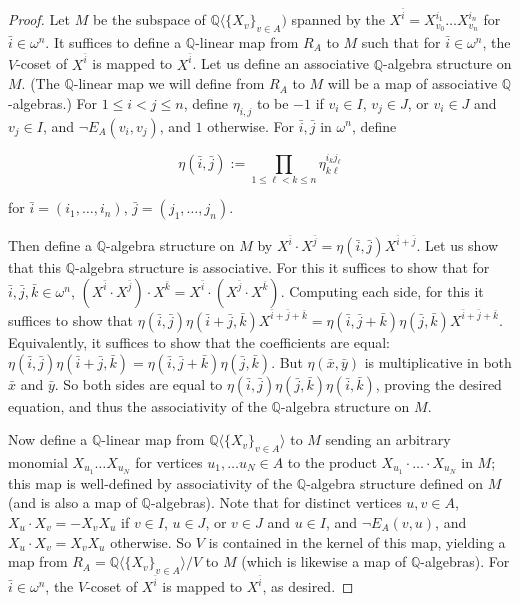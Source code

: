 \documentclass{amsart}
\theoremstyle{definition}
\theoremstyle{remark}
\numberwithin{equation}{section}
\begin{document}
\begin{proof}
    Let $M$ be the subspace of $\mathbb{Q}\langle\{ X_{v} \}_{v \in A})$ spanned by the $X^{\bar{i}} = X_{v_{0}}^{i_{1}} \ldots X_{v_{n}}^{i_{n}}$ for $\bar{i} \in \omega^{n}$. It suffices to define a $\mathbb{Q}$-linear map from $R_{A}$ to $M$ such that for $\bar{i} \in \omega^{n}$, the $V$-coset of $X^{\bar{i}}$ is mapped to $X^{\bar{i}}$. Let us define an associative $\mathbb{Q}$-algebra structure on $M$. (The $\mathbb{Q}$-linear map we will define from $R_{A}$ to $M$ will be a map of associative $\mathbb{Q}$-algebras.) For $1 \leq i < j \leq n$, define $\eta_{i, j}$ to be $-1$ if $v_{i} \in I$, $v_{j} \in J$, or $v_{i} \in J$ and $v_{j} \in I$, and $\neg E_{A}(v_{i}, v_{j})$, and $1$ otherwise. For $\bar{i}, \bar{j}$ in $\omega^{n}$, define 

$$\eta(\bar{i}, \bar{j}) := \prod_{1 \leq \ell < k \leq n} \eta^{i_{k} j_{\ell}}_{k\ell}$$


for $\bar{i}=(i_{1}, \ldots, i_{n})$, $\bar{j}=(j_{1}, \ldots, j_{n})$.


Then define a $\mathbb{Q}$-algebra structure on $M$ by $X^{\bar{i}}\cdot X^{\bar{j}} = \eta(\bar{i}, \bar{j}) X^{\bar{i}+\bar{j}}$. Let us show that this $\mathbb{Q}$-algebra structure is associative. For this it suffices to show that for $\bar{i}, \bar{j}, \bar{k} \in \omega^{n}$, $(X^{\bar{i}}\cdot X^{\bar{j}}) \cdot X^{\bar{k}} = X^{\bar{i}} \cdot (X^{\bar{j}}\cdot X^{\bar{k}}) $. Computing each side, for this it suffices to show that $\eta(\bar{i}, \bar{j})\eta(\bar{i}+\bar{j}, \bar{k})X^{\bar{i}+\bar{j} + \bar{k}}= \eta(\bar{i}, \bar{j}+\bar{k})\eta(\bar{j}, \bar{k}) X^{\bar{i}+\bar{j} + \bar{k}}$. Equivalently, it suffices to show that the coefficients are equal: $\eta(\bar{i}, \bar{j})\eta(\bar{i}+\bar{j}, \bar{k})= \eta(\bar{i}, \bar{j}+\bar{k})\eta(\bar{j}, \bar{k}) $. But $\eta(\bar{x}, \bar{y})$ is multiplicative in both $\bar{x}$ and $\bar{y}$. So both sides are equal to $\eta(\bar{i}, \bar{j}) \eta(\bar{j}, \bar{k})\eta(\bar{i}, \bar{k})$, proving the desired equation, and thus the associativity of the $\mathbb{Q}$-algebra structure on $M$.

Now define a $\mathbb{Q}$-linear map from $\mathbb{Q}\langle\{ X_{v} \}_{v \in A}\rangle$ to $M$ sending an arbitrary monomial $X_{u_{1}} \ldots X_{u_{N}}$ for vertices $u_{1}, \ldots u_{N} \in A$ to the product $X_{u_{1}} \cdot \ldots \cdot X_{u_{N}}$ in $M$; this map is well-defined by associativity of the $\mathbb{Q}$-algebra structure defined on $M$ (and is also a map of $\mathbb{Q}$-algebras). Note that for distinct vertices $u, v \in A$, $X_{u} \cdot X_{v}=-X_{v}X_{u}$ if $v \in I$, $u \in J$, or $v \in J$ and $u \in I$, and $\neg E_{A}(v, u)$, and $X_{u} \cdot X_{v}=X_{v}X_{u}$ otherwise. So $V$ is contained in the kernel of this map, yielding a map from $R_{A} = \mathbb{Q}\langle\{ X_{v} \}_{v \in A}\rangle/V$ to $M$ (which is likewise a map of $\mathbb{Q}$-algebras). For $\bar{i} \in \omega^{n}$, the $V$-coset of $X^{\bar{i}}$ is mapped to $X^{\bar{i}}$, as desired.
\end{proof}
\end{document}
